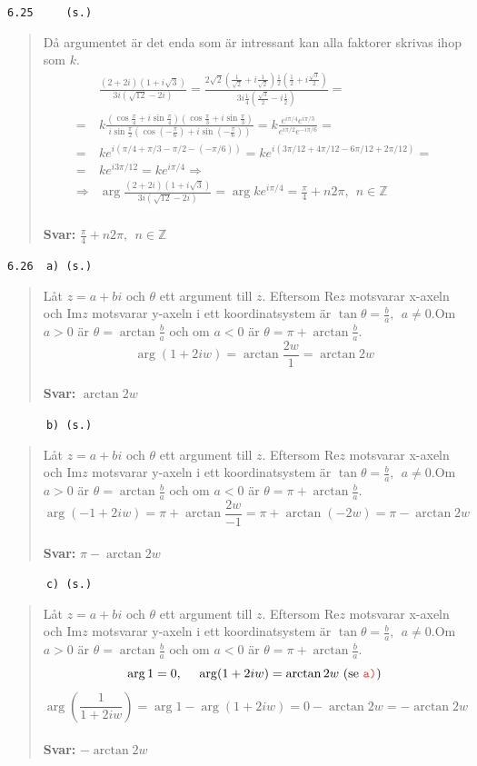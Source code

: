 \documentclass[a4paper]{article}
\newcommand{\tskcol}[1]{\textcolor{tskcol}{#1}}
\begin{document}
	\texttt{\tskcol{6.25~~~~ (s.)}}
	\begin{quotation}
		\noindent
		Då argumentet är det enda som är intressant kan alla faktorer skrivas ihop som $k$.
		\begin{align*}
		&\frac{(2+2i)(1+i\sqrt{3})}{3i(\sqrt{12}-2i)}=
		\frac{2\sqrt{2}(\frac{1}{\sqrt{2}}+i\frac{1}{\sqrt{2}})\frac{1}{2}(\frac{1}{2}+i\frac{\sqrt{3}}{2})}{3i\frac{1}{4}(\frac{\sqrt{3}}{2}-i\frac{1}{2})}= \\ =
		&k\frac{(\cos\frac{\pi}{4}+i\sin\frac{\pi}{4})(\cos\frac{\pi}{3}+i\sin\frac{\pi}{3})}{i\sin\frac{\pi}{2}(\cos(-\frac{\pi}{6})+i\sin(-\frac{\pi}{6}))}=
		k\frac{e^{i\pi/4}e^{i\pi/3}}{e^{i\pi/2}e^{-i\pi/6}}= \\ =
		&ke^{i(\pi/4+\pi/3-\pi/2-(-\pi/6))}=
		ke^{i(3\pi/12+4\pi/12-6\pi/12+2\pi/12)}= \\ =
		&ke^{i3\pi/12}=
		ke^{i\pi/4} \Rightarrow \\ \Rightarrow
		&\arg\frac{(2+2i)(1+i\sqrt{3})}{3i(\sqrt{12}-2i)}=\arg ke^{i\pi/4}=\frac{\pi}{4}+n2\pi, ~~ n\in\mathbb{Z}
		\end{align*}
		\\
		\textbf{Svar:} $\frac{\pi}{4}+n2\pi, ~~ n\in\mathbb{Z}$
	\end{quotation}
	
	\texttt{\tskcol{6.26~~a) (s.)}}
	\begin{quotation}
		\noindent
		Låt $z=a+bi$ och $\theta$ ett argument till $z$. Eftersom Re$z$ motsvarar x-axeln och Im$z$ motsvarar y-axeln i ett koordinatsystem är $\tan\theta=\frac{b}{a},~~a\neq 0$.Om $a > 0$ är $\theta=\arctan\frac{b}{a}$ och om $a < 0$ är $\theta=\pi+\arctan\frac{b}{a}$.
		\[\arg(1+2iw)=\arctan\frac{2w}{1}=\arctan2w\]
		\\
		\textbf{Svar:} $\arctan2w$
	\end{quotation}
	
	\texttt{\tskcol{~~~~~~b) (s.)}}
	\begin{quotation}
		\noindent
		Låt $z=a+bi$ och $\theta$ ett argument till $z$. Eftersom Re$z$ motsvarar x-axeln och Im$z$ motsvarar y-axeln i ett koordinatsystem är $\tan\theta=\frac{b}{a},~~a\neq 0$.Om $a > 0$ är $\theta=\arctan\frac{b}{a}$ och om $a < 0$ är $\theta=\pi+\arctan\frac{b}{a}$.
		\[\arg(-1+2iw)=\pi+\arctan\frac{2w}{-1}=\pi+\arctan(-2w)=\pi-\arctan2w\]
		\\
		\textbf{Svar:} $\pi-\arctan2w$
	\end{quotation}
	
	\texttt{\tskcol{~~~~~~c) (s.)}}
	\begin{quotation}
		\noindent
		Låt $z=a+bi$ och $\theta$ ett argument till $z$. Eftersom Re$z$ motsvarar x-axeln och Im$z$ motsvarar y-axeln i ett koordinatsystem är $\tan\theta=\frac{b}{a},~~a\neq 0$.Om $a > 0$ är $\theta=\arctan\frac{b}{a}$ och om $a < 0$ är $\theta=\pi+\arctan\frac{b}{a}$.
		\[\arg 1 = 0,~~~~\arg(1+2iw) = \arctan2w \text{ (se \texttt{\tskcol{a)}})}\]
		\[\arg\left(\frac{1}{1+2iw}\right)=\arg 1 - \arg(1+2iw)=0-\arctan2w=-\arctan2w\]
		\\
		\textbf{Svar:} $-\arctan2w$
	\end{quotation}
	
\end{document}
